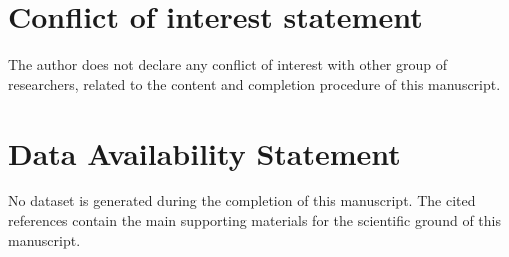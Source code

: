 \documentclass[12pt, reqno]{amsart}
\theoremstyle{definition}
\theoremstyle{remark}
\numberwithin{equation}{section}
\begin{document}
\section*{Conflict of interest statement}
The author does not declare any conflict of interest with other group of researchers, related to the content and completion procedure of this manuscript.


\section*{Data Availability Statement}
No dataset is generated during the completion of this manuscript. The cited references contain the main supporting materials for the scientific ground of this manuscript.





\end{document}
